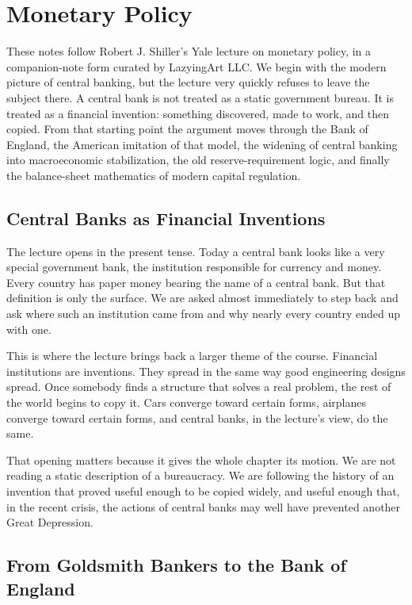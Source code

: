 \chapter{Monetary Policy}

These notes follow Robert J. Shiller's Yale lecture on monetary policy, in a companion-note form curated by LazyingArt LLC. We begin with the modern picture of central banking, but the lecture very quickly refuses to leave the subject there. A central bank is not treated as a static government bureau. It is treated as a financial invention: something discovered, made to work, and then copied. From that starting point the argument moves through the Bank of England, the American imitation of that model, the widening of central banking into macroeconomic stabilization, the old reserve-requirement logic, and finally the balance-sheet mathematics of modern capital regulation.

\section{Central Banks as Financial Inventions}

The lecture opens in the present tense. Today a central bank looks like a very special government bank, the institution responsible for currency and money. Every country has paper money bearing the name of a central bank. But that definition is only the surface. We are asked almost immediately to step back and ask where such an institution came from and why nearly every country ended up with one.

This is where the lecture brings back a larger theme of the course. Financial institutions are inventions. They spread in the same way good engineering designs spread. Once somebody finds a structure that solves a real problem, the rest of the world begins to copy it. Cars converge toward certain forms, airplanes converge toward certain forms, and central banks, in the lecture's view, do the same.

That opening matters because it gives the whole chapter its motion. We are not reading a static description of a bureaucracy. We are following the history of an invention that proved useful enough to be copied widely, and useful enough that, in the recent crisis, the actions of central banks may well have prevented another Great Depression.

\section{From Goldsmith Bankers to the Bank of England}

